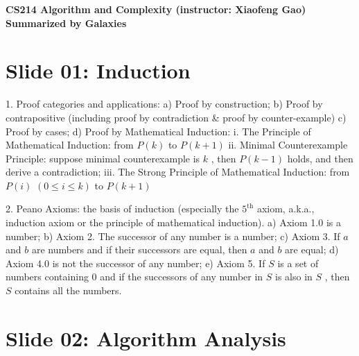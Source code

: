 \documentclass[10pt,a4paper]{article}
\begin{document}
\begin{center}
    \textbf{CS214 Algorithm and Complexity (instructor: Xiaofeng Gao)} \\
    \textbf{Summarized by Galaxies}
\end{center}

\section*{Slide 01: Induction}

1. Proof categories and applications:
a) Proof by construction;
b) Proof by contrapositive (including proof by contradiction \& proof by counter-example)
c) Proof by cases;
d) Proof by Mathematical Induction:
    i. The Principle of Mathematical Induction: from \(P(k)\) to \(P(k + 1)\)
    ii. Minimal Counterexample Principle: suppose minimal counterexample is \(k\) , then \(P(k - 1)\) holds, and then derive a contradiction;
    iii. The Strong Principle of Mathematical Induction: from \(P(i)\) \((0\leq i\leq k)\) to \(P(k + 1)\)

2. Peano Axioms: the basis of induction (especially the \(5^{\mathrm{th}}\) axiom, a.k.a., induction axiom or the principle of mathematical induction).
a) Axiom 1.0 is a number;
b) Axiom 2. The successor of any number is a number;
c) Axiom 3. If \(a\) and \(b\) are numbers and if their successors are equal, then \(a\) and \(b\) are equal;
d) Axiom 4.0 is not the successor of any number;
e) Axiom 5. If \(S\) is a set of numbers containing 0 and if the successors of any number in \(S\) is also in \(S\) , then \(S\) contains all the numbers.

\section*{Slide 02: Algorithm Analysis}
\end{document}

